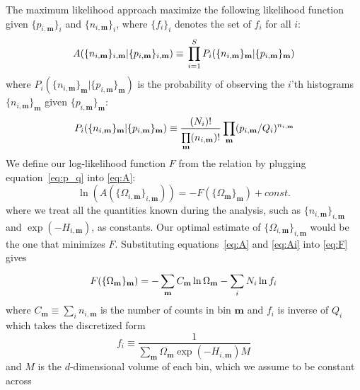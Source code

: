 The maximum likelihood approach maximize the following likelihood function given 
$\{p_{i,\mathbf{m}}\}_i$ and $\{n_{i,\mathbf{m}}\}_i$, where $\{f_i\}_i$ denotes the set 
of $f_i$ for all $i$:
\begin{equation}
A(\{n_{i,\mathbf{m}}\}_{i,\mathbf{m}} | \{p_{i,\mathbf{m}}\}_{i,\mathbf{m}}) \equiv \\
\prod_{i=1}^{S} P_{i}(\{n_{i,\mathbf{m}}\}_{\mathbf{m}} | \{p_{i,\mathbf{m}}\}_{\mathbf{m}})
\label{eq:A}
\end{equation}
where $P_{i}(\{n_{i,\mathbf{m}}\}_{\mathbf{m}} | \{p_{i,\mathbf{m}}\}_{\mathbf{m}})$ 
is the probability of observing the $i$'th histograms $\{n_{i,\mathbf{m}}\}_{\mathbf{m}}$ 
given $\{p_{i,\mathbf{m}}\}_{\mathbf{m}}$:
\begin{equation}
P_{i}(\{n_{i,\mathbf{m}}\}_{\mathbf{m}} | \{p_{i,\mathbf{m}}\}_{\mathbf{m}}) \equiv \\
\frac{(N_i)!}{\prod\limits_{\mathbf{m}}^{} (n_{i,\mathbf{m}})!} \\
\prod\limits_{\mathbf{m}}^{} (p_{i,\mathbf{m}}/Q_{i})^{n_{i,\mathbf{m}}}
\label{eq:Ai}
\end{equation}
We define our log-likelihood function $F$ from the relation by plugging equation~\ref{eq:p_q} 
into \ref{eq:A}:
\begin{equation}
\ln(A(\{\Omega_{i,\mathbf{m}}\}_{i,\mathbf{m}})) = - F(\{\Omega_{\mathbf{m}}\}_{\mathbf{m}}) + const.
\label{eq:F}
\end{equation}
where we treat all the quantities known during the analysis, such as 
$\{n_{i,\mathbf{m}}\}_{i,\mathbf{m}}$ and $\exp(-H_{i,\mathbf{m}})$, as constants.
Our optimal estimate of $\{\Omega_{i,\mathbf{m}}\}_{i,\mathbf{m}}$ would be the one 
that minimizes $F$. Substituting equations~\ref{eq:A} and \ref{eq:Ai} into \ref{eq:F} 
gives 
\begin{equation}
F(\{\Omega_{\mathbf{m}}\}_{\mathbf{m}}) = -\sum_{\mathbf{m}}^{} C_{\mathbf{m}} \ln \Omega_{\mathbf{m}} \\
- \sum_{i}^{} N_i \ln f_{i}
\label{eq:Fexw}
\end{equation}
where $C_{\mathbf{m}} \equiv \sum\limits_{i}^{} n_{i,\mathbf{m}}$ is the number of counts
in bin $\mathbf{m}$ and $f_{i}$ is inverse of $Q_{i}$ which takes the discretized form
\begin{equation}
f_{i} \equiv \frac{1}{\sum_{\mathbf{m}}^{} \Omega_{\mathbf{m}} \exp(-H_{i,\mathbf{m}}) M}
\end{equation}
and $M$ is the $d$-dimensional volume of each bin, which we assume to be constant across 
